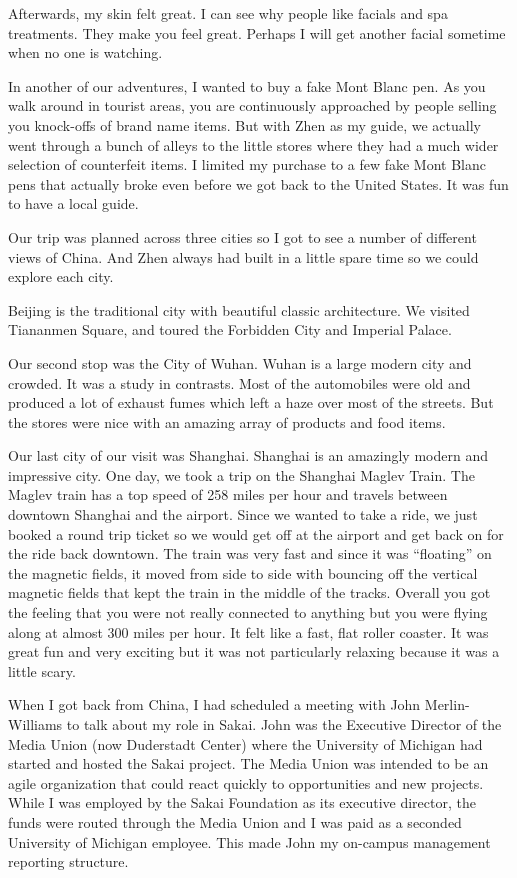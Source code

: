 \documentclass[12pt]{book}
\begin{document}
Afterwards, my skin felt great.  I can see why people like facials and
spa treatments.  They make you feel great.  Perhaps I will get another facial
sometime when no one is watching.

In another of our adventures, I wanted to buy a fake Mont Blanc pen.   As you walk
around in tourist areas, you are continuously approached by people selling you
knock-offs of brand name items.   But with Zhen as my guide, we actually went
through a bunch of alleys to the little stores where they had a much wider selection
of counterfeit items.  I limited my purchase to a few fake Mont Blanc pens
that actually broke even before we got back to the United States.  It was
fun to have a local guide.

Our trip was planned across three cities so I got to see a number of different
views of China.   And Zhen always had built in a little spare time so we could
explore each city.

Beijing is the traditional city with beautiful classic architecture.   We
visited Tiananmen Square, and toured the Forbidden City and Imperial Palace.

Our second stop was the City of Wuhan.   Wuhan is a large modern city and
crowded.   It was a study in contrasts.   Most of the automobiles
were old and produced a lot of exhaust fumes which left a haze over most
of the streets.  But the stores were nice with an amazing array of
products and food items.

Our last city of our visit was Shanghai.   Shanghai is an amazingly modern
and impressive city.   One day, we took a trip on the Shanghai Maglev Train.
The Maglev train has a top speed of 258 miles per hour and travels between
downtown Shanghai and the airport.   Since we wanted to take a ride, we just
booked a round trip ticket so we would get off at the airport and get back on
for the ride back downtown.  The train was very fast and since it was ``floating''
on the magnetic fields, it moved from side to side with bouncing off the
vertical magnetic fields that kept the train in the middle of the tracks.
Overall you got the feeling that you were not really connected to anything
but you were flying along at almost 300 miles per hour.  It felt like a
fast, flat roller coaster.  It was great fun and very exciting but it was
not particularly relaxing because it was a little scary.

When I got back from China, I had scheduled a meeting with John Merlin-Williams to
talk about my role in Sakai.  John was the Executive Director of the
Media Union (now Duderstadt Center) where the University of Michigan had
started and hosted the Sakai project.   The Media Union was intended to be an
agile organization that could react quickly to opportunities and new projects.
While I was employed by the Sakai Foundation as its executive director, the funds
were routed through the Media Union and I was paid as a seconded University
of Michigan employee.  This made John my on-campus management reporting structure.
\end{document}
